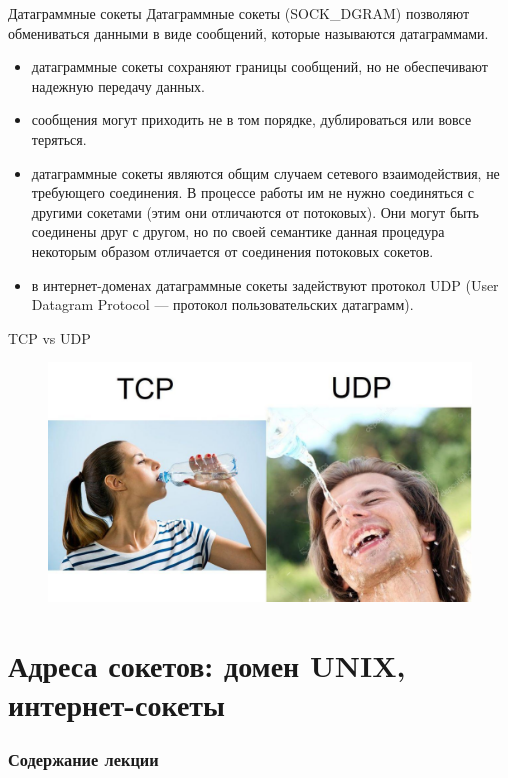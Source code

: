 \documentclass{beamer}
\begin{document}
\begin{frame}{Датаграммные сокеты}
    Датаграммные сокеты (SOCK\_DGRAM) позволяют обмениваться данными в виде сообщений, которые называются датаграммами. 
    \begin{itemize}
    	\item датаграммные сокеты сохраняют границы сообщений, но не обеспечивают надежную передачу данных. 
    	\item сообщения могут приходить не в том порядке, дублироваться или вовсе теряться. 
    	\item датаграммные сокеты являются общим случаем сетевого взаимодействия, не требующего соединения. В процессе работы им не нужно соединяться с другими сокетами (этим они отличаются от потоковых). Они могут быть соединены друг с другом, но по своей семантике данная процедура некоторым образом отличается от соединения потоковых сокетов.
    	\item в интернет-доменах датаграммные сокеты задействуют протокол UDP (User Datagram Protocol — протокол пользовательских датаграмм).   	
    \end{itemize}  
\end{frame}

\begin{frame}{TCP vs UDP}
    \begin{figure}
    \includegraphics[scale=0.33]{images/tcp_udp.jpg}
    \end{figure}
\end{frame}

\section{Адреса сокетов: домен UNIX, интернет-сокеты}

\begin{frame}
  \frametitle{Содержание лекции}
  \tableofcontents[current]
\end{frame}
\end{document}
